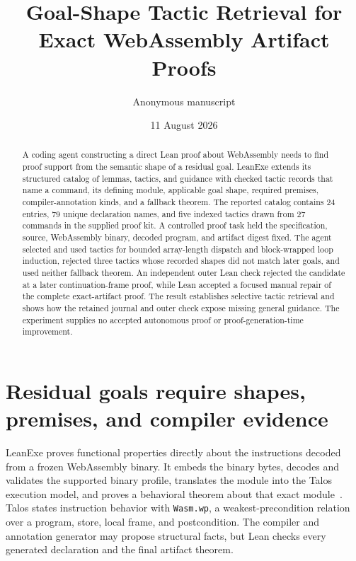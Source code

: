 \documentclass[10pt]{article}
\title{Goal-Shape Tactic Retrieval for Exact WebAssembly Artifact Proofs}
\author{Anonymous manuscript}
\date{11 August 2026}
\newcommand{\code}[1]{\texttt{#1}}
\begin{document}
\maketitle

\begin{abstract}
A coding agent constructing a direct Lean proof about WebAssembly needs to find proof support from the semantic shape of a residual goal.  LeanExe extends its structured catalog of lemmas, tactics, and guidance with checked tactic records that name a command, its defining module, applicable goal shape, required premises, compiler-annotation kinds, and a fallback theorem.  The reported catalog contains 24 entries, 79 unique declaration names, and five indexed tactics drawn from 27 commands in the supplied proof kit.  A controlled proof task held the specification, source, WebAssembly binary, decoded program, and artifact digest fixed.  The agent selected and used tactics for bounded array-length dispatch and block-wrapped loop induction, rejected three tactics whose recorded shapes did not match later goals, and used neither fallback theorem.  An independent outer Lean check rejected the candidate at a later continuation-frame proof, while Lean accepted a focused manual repair of the complete exact-artifact proof.  The result establishes selective tactic retrieval and shows how the retained journal and outer check expose missing general guidance.  The experiment supplies no accepted autonomous proof or proof-generation-time improvement.
\end{abstract}

\section{Residual goals require shapes, premises, and compiler evidence}

LeanExe proves functional properties directly about the instructions decoded from a frozen WebAssembly binary.  It embeds the binary bytes, decodes and validates the supported binary profile, translates the module into the Talos execution model, and proves a behavioral theorem about that exact module~\cite{Haas2017WebAssembly,Watt2018Mechanising,TalosSoftware,LeanExeSoftware}.  Talos states instruction behavior with \code{Wasm.wp}, a weakest-precondition relation over a program, store, local frame, and postcondition.  The compiler and annotation generator may propose structural facts, but Lean checks every generated declaration and the final artifact theorem.
\end{document}
